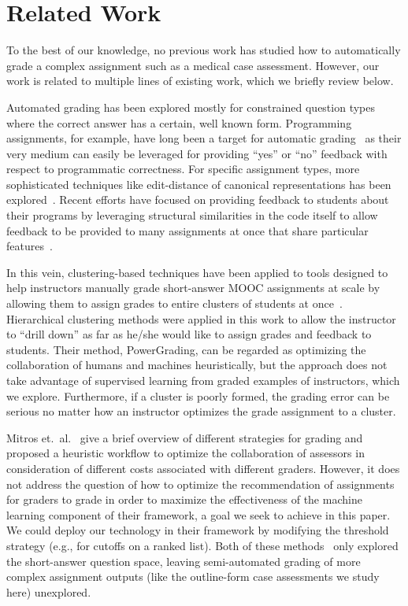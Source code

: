 \section{Related Work}
\label{sec:related}

To the best of our knowledge, no previous work has studied how to automatically grade
a complex assignment such as a medical case assessment. However, our work
is related to multiple lines of existing work, which we briefly review below. 

Automated grading has been explored mostly for constrained question
types where the correct answer has a certain, well known form. Programming
assignments, for example, have long been a target for automatic
grading~\cite{Forsythe:1965:CACM, Helmick:2007:ITICSE} as their very medium
can easily be leveraged for providing ``yes'' or ``no'' feedback with
respect to programmatic correctness. For specific assignment types, more
sophisticated techniques like edit-distance of canonical representations
has been explored~\cite{Alur:2013:IJCAI}. Recent efforts have focused on
providing feedback to students about their programs by leveraging
structural similarities in the code itself to allow feedback to be provided
to many assignments at once that share particular
features~\cite{Nguyen:2014:WWW, Piech:2015:ICML}.

In this vein, clustering-based techniques have been applied to tools
designed to help instructors manually grade short-answer MOOC assignments
at scale by allowing them to assign grades to entire clusters of students
at once~\cite{Brooks:2014:Powergrading}. Hierarchical clustering methods
were applied in this work to allow the instructor to ``drill down'' as far
as he/she would like to assign grades and feedback to students. Their
method, PowerGrading, can be regarded as optimizing the collaboration of
humans and machines heuristically, but the approach does not take advantage
of supervised learning from graded examples of instructors, which we
explore. Furthermore, if a cluster is poorly formed, the grading error can
be serious no matter how an instructor optimizes the grade assignment to a
cluster.

Mitros et.\ al.~\cite{Mitros:2013:MITLINC} give a brief overview of
different strategies for grading and proposed a heuristic workflow to
optimize the collaboration of assessors in consideration of different costs
associated with different graders. However, it does not address the
question of how to optimize the recommendation of assignments for graders
to grade in order to maximize the effectiveness of the machine learning
component of their framework, a goal we seek to achieve in this paper.
We could deploy our technology in their framework by modifying the
threshold strategy (e.g., for cutoffs on a ranked list). Both of these
methods~\cite{Brooks:2014:Powergrading, Mitros:2013:MITLINC} only explored
the short-answer question space, leaving semi-automated grading of more
complex assignment outputs (like the outline-form case assessments we study
here) unexplored.

